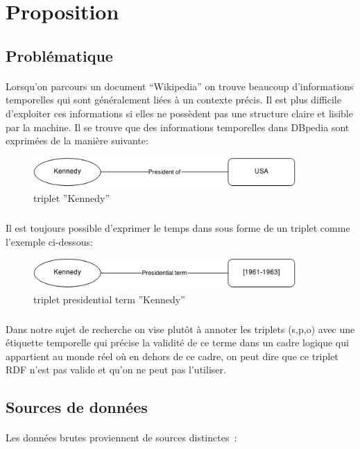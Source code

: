 \section*{Proposition}
\subsection*{Problématique}
\paragraph{}
Lorsqu’on parcours un document “Wikipedia” on trouve beaucoup d’informations temporelles qui sont généralement liées à un contexte précis.
Il est plus difficile d’exploiter ces informations si elles ne possèdent pas une structure claire et lisible par la machine.
\newline
Il se trouve que des informations temporelles dans DBpedia sont exprimées de la manière suivante: 
\begin{figure}[H]
        \centering
                \centering
                \includegraphics[width=10cm]{ken.png}
               \caption{triplet ''Kennedy''}

\end{figure}
\subparagraph{}
Il est toujours possible d’exprimer le temps dans sous forme de un triplet comme l’exemple ci-dessous: 
\begin{figure}[H]
        \centering
                \centering
                \includegraphics[width=10cm]{presidterm.png}
               \caption{triplet presidential term ''Kennedy''}

\end{figure}
\subparagraph{}
Dans notre sujet de recherche on vise plutôt à annoter les triplets (s,p,o) avec une étiquette temporelle qui précise la validité de ce terme dans un cadre logique qui appartient au monde réel où en dehors de ce cadre, on peut dire que ce triplet RDF n’est pas valide et qu’on ne peut pas l’utiliser.
\subsection*{Sources de données}
\paragraph{}
Les données brutes proviennent de sources distinctes~:
